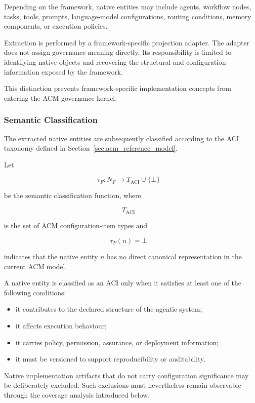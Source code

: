 \documentclass[10pt]{article}
\begin{document}
Depending on the framework, native entities may include agents, workflow nodes,
tasks, tools, prompts, language-model configurations, routing conditions,
memory components, or execution policies.

Extraction is performed by a framework-specific projection adapter. The adapter
does not assign governance meaning directly. Its responsibility is limited to
identifying native objects and recovering the structural and configuration
information exposed by the framework.

This distinction prevents framework-specific implementation concepts from
entering the ACM governance kernel.

\subsubsection{Semantic Classification}

The extracted native entities are subsequently classified according to the ACI
taxonomy defined in Section~\ref{sec:acm_reference_model}.

Let

\[
\tau_F :
N_F
\rightarrow
T_{\mathrm{ACI}}
\cup
\{\bot\}
\tag{40}
\]

be the semantic classification function, where

\[
T_{\mathrm{ACI}}
\]

is the set of ACM configuration-item types and

\[
\tau_F(n)=\bot
\]

indicates that the native entity $n$ has no direct canonical representation in
the current ACM model.

A native entity is classified as an ACI only when it satisfies at least one of
the following conditions:

\begin{itemize}
    \item it contributes to the declared structure of the agentic system;
    \item it affects execution behaviour;
    \item it carries policy, permission, assurance, or deployment information;
    \item it must be versioned to support reproducibility or auditability.
\end{itemize}

Native implementation artifacts that do not carry configuration significance
may be deliberately excluded. Such exclusions must nevertheless remain
observable through the coverage analysis introduced below.
\end{document}
